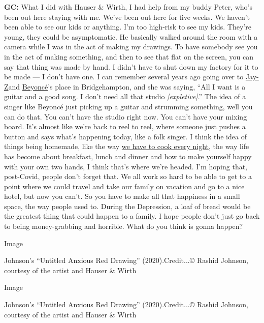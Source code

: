 \textbf{GC:} What I did with Hauser \& Wirth, I had help from my buddy
Peter, who's been out here staying with me. We've been out here for five
weeks. We haven't been able to see our kids or anything. I'm too
high-risk to see my kids. They're young, they could be asymptomatic. He
basically walked around the room with a camera while I was in the act of
making my drawings. To have somebody see you in the act of making
something, and then to see that flat on the screen, you can say that
thing was made by hand. I didn't have to shut down my factory for it to
be made --- I don't have one. I can remember several years ago going
over to
\href{https://www.nytimes3xbfgragh.onion/interactive/2017/11/29/t-magazine/jay-z-dean-baquet-interview.html}{Jay-Z}and
\href{https://www.nytimes3xbfgragh.onion/2014/06/03/t-magazine/beyonce-the-woman-on-top-of-the-world.html}{Beyoncé}'s
place in Bridgehampton, and she was saying, ``All I want is a guitar and
a good song. I don't need all that studio \emph{{[}expletive{]}}.'' The
idea of a singer like Beyoncé just picking up a guitar and strumming
something, well you can do that. You can't have the studio right now.
You can't have your mixing board. It's almost like we're back to reel to
reel, where someone just pushes a button and says what's happening
today, like a folk singer. I think the idea of things being homemade,
like the way
\href{https://www.nytimes3xbfgragh.onion/article/easy-recipes-coronavirus.html}{we
have to cook every night}, the way life has become about breakfast,
lunch and dinner and how to make yourself happy with your own two hands,
I think that's where we're headed. I'm hoping that, post-Covid, people
don't forget that. We all work so hard to be able to get to a point
where we could travel and take our family on vacation and go to a nice
hotel, but now you can't. So you have to make all that happiness in a
small space, the way people used to. During the Depression, a loaf of
bread would be the greatest thing that could happen to a family. I hope
people don't just go back to being money-grabbing and horrible. What do
you think is gonna happen?

Image

Johnson's ``Untitled Anxious Red Drawing'' (2020).Credit...© Rashid
Johnson, courtesy of the artist and Hauser \& Wirth

Image

Johnson's ``Untitled Anxious Red Drawing'' (2020).Credit...© Rashid
Johnson, courtesy of the artist and Hauser \& Wirth

